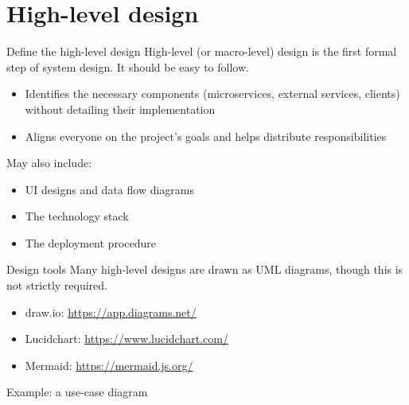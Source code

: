 \documentclass[aspectratio=169]{beamer}
\newcommand{\actor}[3]{%
  \begin{scope}[shift={#1}]
    \draw (0,0.42) circle (0.12);
    \draw (0,0.30) -- (0,0) (-0.2,0.2) -- (0.2,0.2) (0,0) -- (-0.15,-0.25)
          (0,0) -- (0.15,-0.25);
    \node[font=\small, below] at (0,-0.28) {#3};
    \coordinate (#2) at (0,0.15);
  \end{scope}}
\begin{document}
\section{High-level design}

\begin{frame}{Define the high-level design}
  High-level (or macro-level) design is the first formal step of system design. It should be
  easy to follow.
  \begin{itemize}
    \item Identifies the necessary components (microservices, external services, clients)
      without detailing their implementation
    \item Aligns everyone on the project's goals and helps distribute responsibilities
  \end{itemize}
  May also include:
  \begin{itemize}
    \item UI designs and data flow diagrams
    \item The technology stack
    \item The deployment procedure
  \end{itemize}
\end{frame}

\begin{frame}{Design tools}
  Many high-level designs are drawn as UML diagrams, though this is not strictly required.
  \begin{itemize}
    \item draw.io: \url{https://app.diagrams.net/}
    \item Lucidchart: \url{https://www.lucidchart.com/}
    \item Mermaid: \url{https://mermaid.js.org/}
  \end{itemize}
\end{frame}

\begin{frame}{Example: a use-case diagram}
  \centering
\end{frame}
\end{document}
